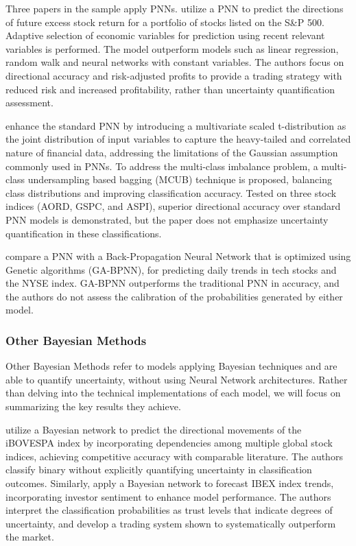 Three papers in the sample apply PNNs.
\textcite{Thawornwong2004pnn} utilize a PNN to predict the directions of future
excess stock return for a portfolio of stocks listed on the S\&P 500. Adaptive selection of economic variables for prediction using recent relevant variables is performed. The model outperform models such as linear regression, random walk and neural networks with constant variables. The authors focus on directional accuracy and risk-adjusted profits to provide a trading strategy with reduced risk and increased profitability, rather than uncertainty quantification assessment.  

\textcite{Chandrasekara2019pnn} enhance the standard PNN by introducing a multivariate scaled t-distribution as the joint distribution of input variables to capture the heavy-tailed and correlated nature of financial data, addressing the limitations of the Gaussian assumption commonly used in PNNs. To address the multi-class imbalance problem, a multi-class undersampling based bagging (MCUB) technique is proposed, balancing class distributions and improving classification accuracy. Tested on three stock indices (AORD, GSPC, and ASPI), superior directional accuracy over standard PNN models is demonstrated, but the paper does not emphasize uncertainty quantification in these classifications.   

\textcite{Lahmiri2024pnn} compare a PNN with a Back-Propagation Neural Network that is optimized using Genetic algorithms (GA-BPNN), for predicting daily trends in tech stocks and the NYSE index. GA-BPNN outperforms the traditional PNN in accuracy, and the authors do not assess the calibration of the probabilities generated by either model. 


\subsubsection{Other Bayesian Methods}
Other Bayesian Methods refer to models applying Bayesian techniques and are able to quantify uncertainty, without using Neural Network architectures. Rather than delving into the technical implementations of each model, we will focus on summarizing the key results they achieve. 

\textcite{Malagrino2018Forecasting} utilize a Bayesian network to predict the directional movements of the iBOVESPA index by incorporating dependencies among multiple global stock indices, achieving competitive accuracy with comparable literature. The authors classify binary without explicitly quantifying uncertainty in classification outcomes. Similarly, \textcite{Raúl_PlazaCasado_PradoRomán_2021} apply a Bayesian network to forecast IBEX index trends, incorporating investor sentiment to enhance model performance. The authors interpret the classification probabilities as trust levels that indicate degrees of uncertainty, and develop a trading system shown to systematically outperform the market.

